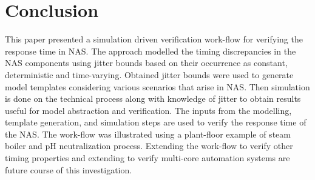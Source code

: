 \documentclass[letterpaper, 10 pt, conference]{ieeeconf}
\begin{document}
\section{Conclusion}
This paper presented a simulation driven verification work-flow for verifying the response time in NAS. The approach modelled the timing discrepancies in the NAS components using jitter bounds based on their occurrence as constant, deterministic and time-varying. Obtained jitter bounds were used to generate model templates considering various scenarios that arise in NAS. Then simulation is done on the technical process along with knowledge of jitter to obtain results useful for model abstraction and verification. The inputs from the modelling, template generation, and simulation steps are used to verify the response time of the NAS. The work-flow was illustrated using a plant-floor example of steam boiler and pH neutralization process. Extending the work-flow to verify other timing properties and extending to verify multi-core automation systems are future course of this investigation.
\end{document}
